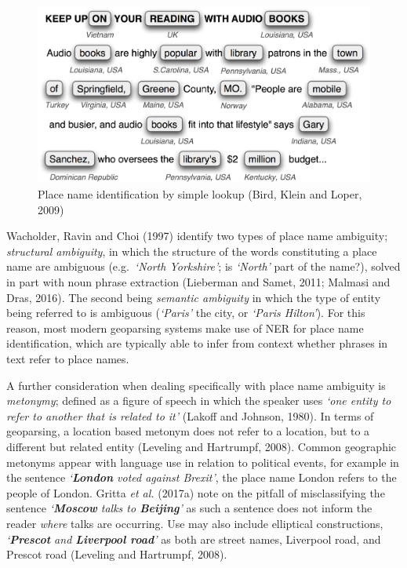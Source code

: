 \documentclass[
  letterpaper,
  11pt,
  english,
  onehalfspacing,
  headsepline]{MastersDoctoralThesis}
\begin{document}
\begin{figure}

{\centering \includegraphics{02_literature/./02_figures/locations.png}

}

\caption{\label{fig-lookup}Place name identification by simple lookup
(Bird, Klein and Loper, 2009)}

\end{figure}

Wacholder, Ravin and Choi (1997) identify two types of place name
ambiguity; \emph{structural ambiguity}, in which the structure of the
words constituting a place name are ambiguous (e.g.~\emph{`North
Yorkshire'}; is \emph{`North'} part of the name?), solved in part with
noun phrase extraction (Lieberman and Samet, 2011; Malmasi and Dras,
2016). The second being \emph{semantic ambiguity} in which the type of
entity being referred to is ambiguous (\emph{`Paris'} the city, or
\emph{`Paris Hilton'}). For this reason, most modern geoparsing systems
make use of NER for place name identification, which are typically able
to infer from context whether phrases in text refer to place names.

A further consideration when dealing specifically with place name
ambiguity is \emph{metonymy}; defined as a figure of speech in which the
speaker uses \emph{`one entity to refer to another that is related to
it'} (Lakoff and Johnson, 1980). In terms of geoparsing, a location
based metonym does not refer to a location, but to a different but
related entity (Leveling and Hartrumpf, 2008). Common geographic
metonyms appear with language use in relation to political events, for
example in the sentence \emph{`\textbf{London} voted against Brexit'},
the place name London refers to the people of London. Gritta \emph{et
al.} (2017a) note on the pitfall of misclassifying the sentence
\emph{`\textbf{Moscow} talks to \textbf{Beijing}'} as such a sentence
does not inform the reader \emph{where} talks are occurring. Use may
also include elliptical constructions, \emph{`\textbf{Prescot} and
\textbf{Liverpool road}'} as both are street names, Liverpool road, and
Prescot road (Leveling and Hartrumpf, 2008).
\end{document}
